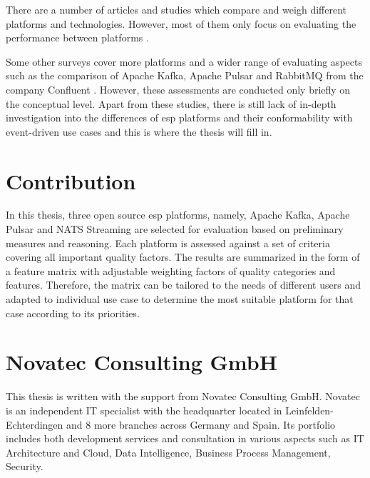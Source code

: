 There are a number of articles and studies which compare and weigh different platforms and technologies. However, most of them only focus on evaluating the performance between platforms \cite{benchmarkkafkapulsarrabbitmq} \cite{benchmarkfull} \cite{benchmarkkafkapulsar}.

Some other surveys cover more platforms and a wider range of evaluating aspects such as the comparison of Apache Kafka, Apache Pulsar and RabbitMQ from the company Confluent \cite{overallcomparekafka}. However, these assessments are conducted only briefly on the conceptual level. Apart from these studies, there is still lack of in-depth investigation into the differences of \acrshort{esp} platforms and their conformability with event-driven use cases and this is where the thesis will fill in.
 
\section{Contribution}
In this thesis, three open source \acrshort{esp} platforms, namely, Apache Kafka, Apache Pulsar and NATS Streaming are selected for evaluation based on preliminary measures and reasoning. Each platform is assessed against a set of criteria covering all important quality factors. The results are summarized in the form of a feature matrix with adjustable weighting factors of quality categories and features. Therefore, the matrix can be tailored to the needs of different users and adapted to individual use case to determine the most suitable platform for that case according to its priorities.

\section{Novatec Consulting GmbH}
This thesis is written with the support from Novatec Consulting GmbH. Novatec is an independent IT specialist with the headquarter located in Leinfelden-Echterdingen and 8 more branches across Germany and Spain. Its portfolio includes both development services and consultation in various aspects such as IT Architecture and Cloud, Data Intelligence, Business Process Management, Security.

